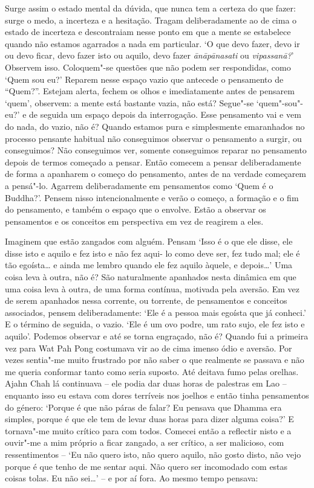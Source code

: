 Surge assim o estado mental da dúvida, que nunca tem a certeza do que
fazer: surge o medo, a incerteza e a hesitação. Tragam deliberadamente
ao de cima o estado de incerteza e descontraiam nesse ponto em que a
mente se estabelece quando não estamos agarrados a nada em particular.
`O que devo fazer, devo ir ou devo ficar, devo fazer isto ou aquilo,
devo fazer \emph{ānāpānasati} ou \emph{vipassanā?}' Observem isso.
Coloquem"-se questões que não podem ser respondidas, como `Quem sou eu?'
Reparem nesse espaço vazio que antecede o pensamento de ``Quem?''.
Estejam alerta, fechem os olhos e imediatamente antes de pensarem
`quem', observem: a mente está bastante vazia, não está? Segue"-se
`quem"-sou"-eu?' e de seguida um espaço depois da interrogação. Esse
pensamento vai e vem do nada, do vazio, não é? Quando estamos pura e
simplesmente emaranhados no processo pensante habitual não conseguimos
observar o pensamento a surgir, ou conseguimos? Não conseguimos ver,
somente conseguimos reparar no pensamento depois de termos começado a
pensar. Então comecem a pensar deliberadamente de forma a apanharem o
começo do pensamento, antes de na verdade começarem a pensá"-lo. Agarrem
deliberadamente em pensamentos como
`Quem é o Buddha?'. Pensem nisso intencionalmente e verão o começo, a
formação e o fim do pensamento, e também o espaço que o envolve. Estão a
observar os pensamentos e os conceitos em perspectiva em vez de reagirem
a eles.

Imaginem que estão zangados com alguém. Pensam `Isso é o que ele disse,
ele disse isto e aquilo e fez isto e não fez aqui- lo como deve ser, fez
tudo mal; ele é tão egoísta\ldots{} e ainda me lembro quando ele fez
aquilo àquele, e depois\ldots{}' Uma coisa leva à outra, não é? São
naturalmente apanhados nesta dinâmica em que uma coisa leva à outra, de
uma forma contínua, motivada pela aversão. Em vez de serem apanhados
nessa corrente, ou torrente, de pensamentos e conceitos associados,
pensem deliberadamente: `Ele é a pessoa mais egoísta que já conheci.' E
o término de seguida, o vazio. `Ele é um ovo podre, um rato sujo, ele
fez isto e aquilo'. Podemos observar e até se torna engraçado, não é?
Quando fui a primeira vez para Wat Pah Pong costumava vir ao de cima
imenso ódio e aversão. Por vezes sentia"-me muito frustrado por não saber
o que realmente se passava e não me queria conformar tanto como seria
suposto. Até deitava fumo pelas orelhas. Ajahn Chah lá continuava -- ele
podia dar duas horas de palestras em Lao -- enquanto isso eu estava com
dores terríveis nos joelhos e então tinha pensamentos do género: `Porque
é que não páras de falar? Eu pensava que Dhamma era simples, porque é
que ele tem de levar duas horas para dizer alguma coisa?'
E tornava"-me muito crítico para com todos. Comecei então a
reflectir nisto e a ouvir"-me a mim próprio a ficar zangado, a ser
crítico, a ser malicioso, com ressentimentos -- `Eu não quero isto, não
quero aquilo, não gosto disto, não vejo porque é que tenho de me sentar
aqui. Não quero ser incomodado com estas coisas tolas. Eu não
sei\ldots{}' -- e por aí fora. Ao mesmo tempo pensava:

